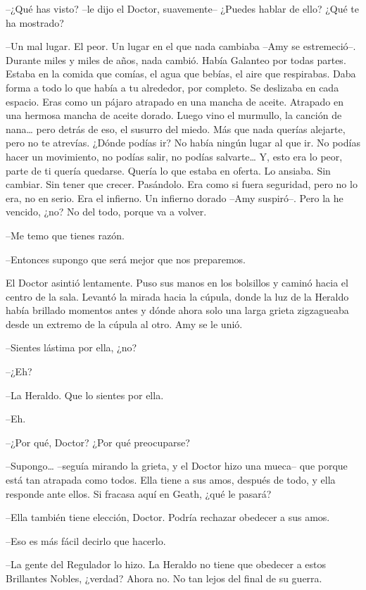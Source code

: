 {--¿Qué has visto? --le dijo el Doctor, suavemente-- ¿Puedes hablar de
ello? ¿Qué te ha mostrado?}

{--Un mal lugar. El peor. Un lugar en el que nada cambiaba --Amy se
	estremeció--. Durante miles y miles de años, nada cambió. Había Galanteo
	por todas partes. Estaba en la comida que comías, el agua que bebías, el
	aire que respirabas. Daba forma a todo lo que había a tu alrededor, por
	completo. Se deslizaba en cada espacio. Eras como un pájaro atrapado en
	una mancha de aceite. Atrapado en una hermosa mancha de aceite dorado.
	Luego vino el murmullo, la canción de nana\ldots{} pero detrás de eso,
	el susurro del miedo. Más que nada querías alejarte, pero no te
	atrevías. ¿Dónde podías ir? No había ningún lugar al que ir. No podías
	hacer un movimiento, no podías salir, no podías salvarte\ldots{} Y, esto
	era lo peor, parte de ti quería quedarse. Quería lo que estaba en
	oferta. Lo ansiaba. Sin cambiar. Sin tener que crecer. Pasándolo. Era
	como si fuera seguridad, pero no lo era, no en serio. Era el infierno.
	Un infierno dorado --Amy suspiró--. Pero la he vencido, ¿no? No del
todo, porque va a volver.}

{--Me temo que tienes razón.}

{--Entonces supongo que será mejor que nos preparemos.}

{El Doctor asintió lentamente. Puso sus manos en los bolsillos y caminó
	hacia el centro de la sala. Levantó la mirada hacia la cúpula, donde la
	luz de la Heraldo había brillado momentos antes y dónde ahora solo una
	larga grieta zigzagueaba desde un extremo de la cúpula al otro. Amy se
le unió.}

{--Sientes lástima por ella, ¿no?}

{--¿Eh?}

{--La Heraldo. Que lo sientes por ella.}

{--Eh.}

{--¿Por qué, Doctor? ¿Por qué preocuparse?}

{--Supongo\ldots{} --seguía mirando la grieta, y el Doctor hizo una
	mueca-- que porque está tan atrapada como todos. Ella tiene a sus amos,
	después de todo, y ella responde ante ellos. Si fracasa aquí en Geath,
¿qué le pasará?}

{--Ella también tiene elección, Doctor. Podría rechazar obedecer a sus
amos.}

{--Eso es más fácil decirlo que hacerlo.}

{--La gente del Regulador lo hizo. La Heraldo no tiene que obedecer a
	estos Brillantes Nobles, ¿verdad? Ahora no. No tan lejos del final de su
guerra.}

